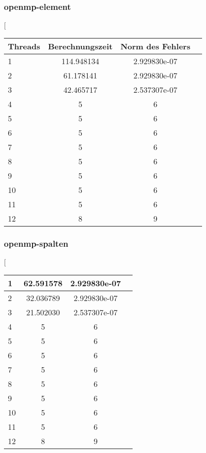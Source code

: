 \documentclass[a4paper]{article}
\begin{document}
	\subsubsection{openmp-element}
	\begin{center}[
		\begin{tabular}{ l | c | c | r } \hline
		 Threads & Berechnungszeit & Norm des Fehlers \\ \hline
		 1 & 114.948134 & 2.929830e-07 \\ \hline
		 2 & 61.178141 & 2.929830e-07 \\ \hline
		 3 & 42.465717 & 2.537307e-07 \\ \hline
		 4 & 5 & 6 \\ \hline
		 5 & 5 & 6 \\ \hline
		 6 & 5 & 6 \\ \hline
		 7 & 5 & 6 \\ \hline
		 8 & 5 & 6 \\ \hline
		 9 & 5 & 6 \\ \hline
		 10 & 5 & 6 \\ \hline
		 11 & 5 & 6 \\ \hline
		 12 & 8 & 9 \\ \hline
	   \end{tabular}
	\end{center}
		\subsubsection{openmp-spalten}
	\begin{center}[
		\begin{tabular}{ l | c | c | r } \hline
		 1 & 62.591578 & 2.929830e-07 \\ \hline
		 2 & 32.036789 & 2.929830e-07 \\ \hline
		 3 & 21.502030 & 2.537307e-07 \\ \hline
		 4 & 5 & 6 \\ \hline
		 5 & 5 & 6 \\ \hline
		 6 & 5 & 6 \\ \hline
		 7 & 5 & 6 \\ \hline
		 8 & 5 & 6 \\ \hline
		 9 & 5 & 6 \\ \hline
		 10 & 5 & 6 \\ \hline
		 11 & 5 & 6 \\ \hline
		 12 & 8 & 9 \\ \hline
	   \end{tabular}
	\end{center}
\end{document}
